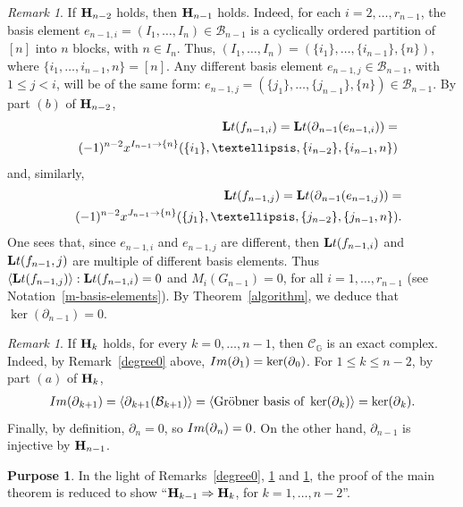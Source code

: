 \documentclass[10pt]{amsart}
\newcommand{\lt}{\mbox{${\bf L}{\rm t}$}}
\newcommand{\mcb}{\mbox{$\mathcal{B}$}}
\newcommand{\mcc}{\mbox{$\mathcal{C}$}}
\newcommand{\mbfh}{\mbox{${\bf H}$}}
\newcommand{\dif}{\mbox{$\partial$}}
\theoremstyle{definition}
\newtheorem{purpose}[cdrthm]{Purpose}
\theoremstyle{remark}
\newtheorem{remark}[cdrthm]{Remark}
\begin{document}
\begin{remark}\label{exactnessn-1}
If $\mbfh_{n-2}$ holds, then $\mbfh_{n-1}$ holds. Indeed, for each
$i=2,\ldots ,r_{n-1}$, the basis element $e_{n-1,i}=(I_1,\ldots
,I_n)\in\mcb_{n-1}$ is a cyclically ordered partition of $[n]$ into
$n$ blocks, with $n\in I_n$. Thus, $(I_1,\ldots ,I_{n})
=(\{i_1\},\ldots ,\{i_{n-1}\},\{n\})$, where $\{i_1,\ldots
,i_{n-1},n\}=[n]$. Any different basis element
$e_{n-1,j}\in\mcb_{n-1}$, with $1\leq j<i$, will be of the same form:
$e_{n-1,j}=(\{j_1\},\ldots ,\{j_{n-1}\},\{n\})\in\mcb_{n-1}$. By part
$(b)$ of $\mbfh_{n-2}$,
\begin{eqnarray*}
&&\lt(f_{n-1,i})= \lt(\dif_{n-1}(e_{n-1,i}))=\\&&
  (-1)^{n-2}x^{I_{n-1}\to\{n\}}(\{i_1\},\ldots
  ,\{i_{n-2}\},\{i_{n-1},n\})
\end{eqnarray*}
and, similarly,
\begin{eqnarray*}
&&\lt(f_{n-1,j})=\lt(\dif_{n-1}(e_{n-1,j}))=\\&&
(-1)^{n-2}x^{J_{n-1}\to\{n\}}(\{j_1\},\ldots
,\{j_{n-2}\},\{j_{n-1},n\}).
\end{eqnarray*}
One sees that, since $e_{n-1,i}$ and $e_{n-1,j}$ are different, then
$\lt(f_{n-1,i})$ and $\lt(f_{n-1},j)$ are multiple of different basis
elements. Thus
$\langle\lt(f_{n-1,j})\rangle:\lt(f_{n-1,i})=0$ and
$M_i(G_{n-1})=0$, for all $i=1,\ldots ,r_{n-1}$ (see
Notation~\ref{m-basis-elements}). By Theorem~\ref{algorithm}, we
deduce that $\ker(\dif_{n-1})=0$.
\end{remark}

\begin{remark}\label{exactness1ton-2}
If $\mbfh_k$ holds, for every $k=0,\ldots ,n-1$, then
$\mcc_{\mathbb{G}}$ is an exact complex. Indeed, by
Remark~\ref{degree0} above, ${\rm Im}(\dif_1)=\ker(\dif_0)$. For
$1\leq k\leq n-2$, by part $(a)$ of $\mbfh_k$,
\begin{eqnarray*}
{\rm Im}(\dif_{k+1})=\langle
\dif_{k+1}(\mcb_{k+1})\rangle=\langle \mbox{Gr\"obner basis of
}\ker(\dif_k)\rangle =\ker(\dif_{k}).
\end{eqnarray*}
Finally, by definition, $\dif_{n}=0$, so ${\rm Im}(\dif_{n})=0$. On
the other hand, $\dif_{n-1}$ is injective by $\mbfh_{n-1}$.
\end{remark}

\begin{purpose}\label{reduction}
In the light of Remarks~\ref{degree0}, \ref{exactnessn-1} and
\ref{exactness1ton-2}, the proof of the main theorem is reduced to
show ``$\mbfh_{k-1}\Rightarrow \mbfh_{k}$, for $k=1,\ldots ,n-2$''.
\end{purpose}
\end{document}
